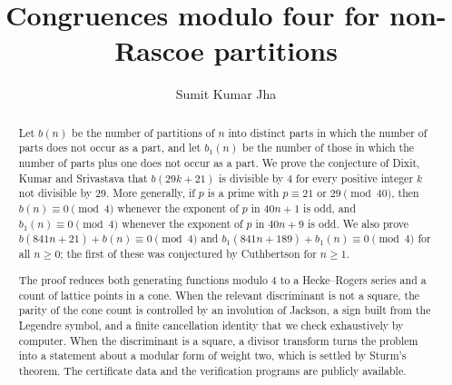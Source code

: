 \documentclass[11pt]{amsart}
\numberwithin{equation}{section}
\theoremstyle{plain}
\theoremstyle{definition}
\begin{document}
\title{Congruences modulo four for non-Rascoe partitions}

\author{Sumit Kumar Jha}
\address{Independent researcher, Greater Noida, Uttar Pradesh, India}


\begin{abstract}
Let $b(n)$ be the number of partitions of $n$ into distinct parts in which the
number of parts does not occur as a part, and let $b_1(n)$ be the number of
those in which the number of parts plus one does not occur as a part. We prove
the conjecture of Dixit, Kumar and Srivastava that $b(29k+21)$ is divisible by
$4$ for every positive integer $k$ not divisible by $29$. More generally, if $p$
is a prime with $p\equiv21$ or $29\pmod{40}$, then $b(n)\equiv0\pmod4$ whenever
the exponent of $p$ in $40n+1$ is odd, and $b_1(n)\equiv0\pmod4$ whenever the
exponent of $p$ in $40n+9$ is odd. We also prove
$b(841n+21)+b(n)\equiv0\pmod4$ and $b_1(841n+189)+b_1(n)\equiv0\pmod4$ for
all $n\ge0$; the first of these was conjectured by Cuthbertson for $n\ge1$.

The proof reduces both generating functions modulo $4$ to a Hecke--Rogers
series and a count of lattice points in a cone. When the relevant
discriminant is not a square, the parity of the cone count is controlled by an
involution of Jackson, a sign built from the Legendre symbol, and a finite
cancellation identity that we check exhaustively by computer. When the
discriminant is a square, a divisor transform turns the problem into a
statement about a modular form of weight two, which is settled by Sturm's
theorem. The certificate data and the verification programs are publicly available.
\end{abstract}

\maketitle
\setcounter{tocdepth}{1}
\tableofcontents











\end{document}
